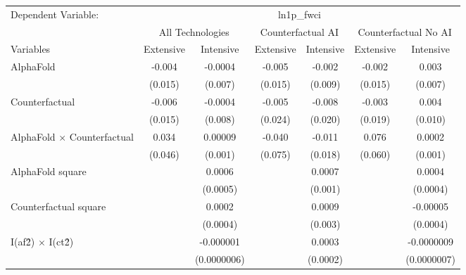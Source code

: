 \begingroup
\centering
\begin{tabular}{lcccccc}
   \tabularnewline \midrule \midrule
   Dependent Variable: & \multicolumn{6}{c}{ln1p\_fwci}\\
 & \multicolumn{2}{c}{All Technologies} & \multicolumn{2}{c}{Counterfactual AI} & \multicolumn{2}{c}{Counterfactual No AI} \\
\cmidrule(lr){1-1}\cmidrule(lr){2-3} \cmidrule(lr){4-5} \cmidrule(lr){6-7}
Variables & \multicolumn{1}{c}{Extensive} & \multicolumn{1}{c}{Intensive} & \multicolumn{1}{c}{Extensive} & \multicolumn{1}{c}{Intensive} & \multicolumn{1}{c}{Extensive} & \multicolumn{1}{c}{Intensive} \\
\cmidrule(lr){1-1}\cmidrule(lr){2-2} \cmidrule(lr){3-3} \cmidrule(lr){4-4} \cmidrule(lr){5-5} \cmidrule(lr){6-6} \cmidrule(lr){7-7}
   AlphaFold                          & -0.004  & -0.0004     & -0.005  & -0.002   & -0.002  & 0.003\\   
                                      & (0.015) & (0.007)     & (0.015) & (0.009)  & (0.015) & (0.007)\\   
   Counterfactual                     & -0.006  & -0.0004     & -0.005  & -0.008   & -0.003  & 0.004\\   
                                      & (0.015) & (0.008)     & (0.024) & (0.020)  & (0.019) & (0.010)\\   
   AlphaFold $\times$ Counterfactual  & 0.034   & 0.00009     & -0.040  & -0.011   & 0.076   & 0.0002\\   
                                      & (0.046) & (0.001)     & (0.075) & (0.018)  & (0.060) & (0.001)\\   
   AlphaFold square                   &         & 0.0006      &         & 0.0007   &         & 0.0004\\   
                                      &         & (0.0005)    &         & (0.001)  &         & (0.0004)\\   
   Counterfactual square              &         & 0.0002      &         & 0.0009   &         & -0.00005\\   
                                      &         & (0.0004)    &         & (0.003)  &         & (0.0004)\\   
   I(af\^2) $\times$ I(ct\^2)         &         & -0.000001   &         & 0.0003   &         & -0.0000009\\   
                                      &         & (0.0000006) &         & (0.0002) &         & (0.0000007)\\   

\end{tabular}
